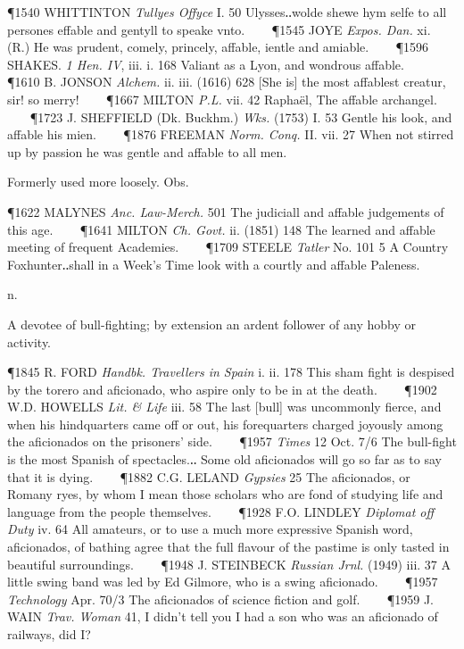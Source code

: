 \begin{description}[wide, labelwidth=!, labelindent=0pt]
\begin{myenumerate}
\P 1540 WHITTINTON \textit{Tullyes Offyce} I. 50 Ulysses‥wolde shewe hym selfe to all persones effable and gentyll to speake vnto.    
\P 1545 JOYE \textit{Expos. Dan.} xi. (R.) He was prudent, comely, princely, affable, ientle and amiable.    
\P 1596 SHAKES. \textit{1 Hen. IV}, iii. i. 168 Valiant as a Lyon, and wondrous affable.    
\P 1610 B. JONSON \textit{Alchem.} ii. iii. (1616) 628 [She is] the most affablest creatur, sir! so merry!    
\P 1667 MILTON \textit{P.L.} vii. 42 Raphaël, The affable archangel.    
\P 1723 J. SHEFFIELD (Dk. Buckhm.) \textit{Wks.} (1753) I. 53 Gentle his look, and affable his mien.    
\P 1876 FREEMAN \textit{Norm. Conq.} II. vii. 27 When not stirred up by passion he was gentle and affable to all men.

 Formerly used more loosely. Obs. 

\P 1622 MALYNES \textit{Anc. Law-Merch.} 501 The judiciall and affable judgements of this age.    
\P 1641 MILTON \textit{Ch. Govt.} ii. (1851) 148 The learned and affable meeting of frequent Academies.    
\P 1709 STEELE \textit{Tatler} No. 101 5 A Country Foxhunter‥shall in a Week's Time look with a courtly and affable Paleness.
\end{myenumerate}

  n.

\noindent  {}

\noindent  
[Sp. = amateur, f. pa. pple. of aficionar to become fond of, f. afición affection.] 

\noindent  
A devotee of bull-fighting; by extension an ardent follower of any hobby or activity. 

\P 1845 R. FORD \textit{Handbk. Travellers in Spain} i. ii. 178 This sham fight is despised by the torero and aficionado, who aspire only to be in at the death.    
\P 1902 W.D. HOWELLS \textit{Lit. \& Life} iii. 58 The last [bull] was uncommonly fierce, and when his hindquarters came off or out, his forequarters charged joyously among the aficionados on the prisoners' side.    
\P 1957 \textit{Times} 12 Oct. 7/6 The bull-fight is the most Spanish of spectacles.‥ Some old aficionados will go so far as to say that it is dying.
   
\P 1882 C.G. LELAND \textit{Gypsies} 25 The aficionados, or Romany ryes, by whom I mean those scholars who are fond of studying life and language from the people themselves.    
\P 1928 F.O. LINDLEY \textit{Diplomat off Duty} iv. 64 All amateurs, or to use a much more expressive Spanish word, aficionados, of bathing agree that the full flavour of the pastime is only tasted in beautiful surroundings.    
\P 1948 J. STEINBECK \textit{Russian Jrnl.} (1949) iii. 37 A little swing band was led by Ed Gilmore, who is a swing aficionado.    
\P 1957 \textit{Technology} Apr. 70/3 The aficionados of science fiction and golf.    
\P 1959 J. WAIN \textit{Trav. Woman} 41, I didn't tell you I had a son who was an aficionado of railways, did I?



\end{description}
